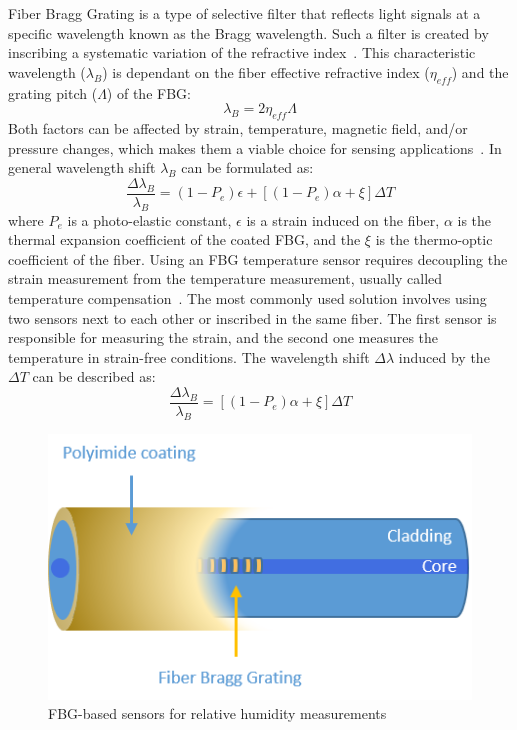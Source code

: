 Fiber Bragg Grating is a type of selective filter that reflects light signals at a specific wavelength known as the Bragg wavelength. Such a filter is created by inscribing a systematic variation of the refractive index~\cite{fbg_overview}. This characteristic wavelength ($\lambda_{B}$) is dependant on the fiber effective refractive index ($\eta_{eff}$) and the grating pitch ($\Lambda$) of the FBG:
\begin{equation}
    \lambda_{B} = 2 \eta_{eff} \Lambda
\end{equation}
Both factors can be affected by strain, temperature, magnetic field, and/or pressure changes, which makes them a viable choice for sensing applications~\cite{Yun-Jiang_Rao_1997}. In general wavelength shift $\lambda_{B}$ can be formulated as:
\begin{equation}
    \frac{\Delta\lambda_{B}}{\lambda_{B}}=(1-P_{e}) \epsilon + \left [(1-P_{e}) \alpha + \xi  \right ] \Delta T
\end{equation}
where $P_{e}$ is a photo-elastic constant, $\epsilon$ is a strain induced on the fiber, $\alpha$ is the thermal expansion coefficient of the coated \gls{FBG}, and the $\xi$ is the thermo-optic coefficient of the fiber. Using an FBG temperature sensor requires decoupling the strain measurement from the temperature measurement, usually called temperature compensation~\cite{Yun-Jiang_Rao_1997}. The most commonly used solution involves using two sensors next to each other or inscribed in the same fiber. The first sensor is responsible for measuring the strain, and the second one measures the temperature in strain-free conditions. The wavelength shift $\Delta \lambda$ induced by the $\Delta T$ can be described as:
\begin{equation}
    \frac{\Delta\lambda_{B}}{\lambda_{B}}=\left [(1-P_{e}) \alpha + \xi  \right ] \Delta T
\end{equation}


\begin{figure}[!h]
\centering
\includegraphics[width=0.45\columnwidth]{Chapter5/images/Picture1.png}
\caption{FBG-based sensors for relative humidity measurements}
\label{fig:fbg_scheme}
\end{figure}


